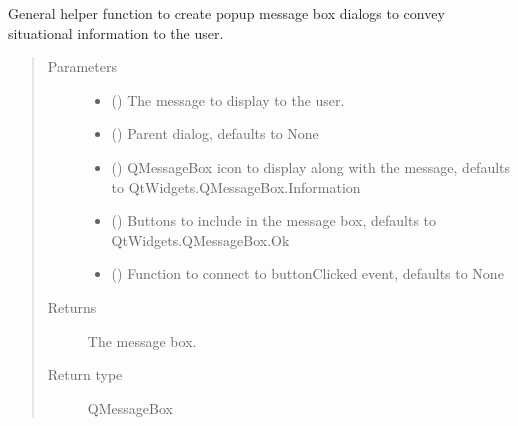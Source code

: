 \documentclass[letterpaper,10pt,english]{sphinxmanual}
\begin{document}
\begin{fulllineitems}
\label{\detokenize{polo.utils:polo.utils.dialog_utils.make_message_box}}
General helper function to create popup message box dialogs to convey
situational information to the user.
\begin{quote}\begin{description}
\item[{Parameters}] \leavevmode\begin{itemize}
\item {} 
 () \textendash{} The message to display to the user.

\item {} 
 (\sphinxstyleliteralemphasis{\sphinxupquote{, }}) \textendash{} Parent dialog, defaults to None

\item {} 
 (\sphinxstyleliteralemphasis{\sphinxupquote{, }}) \textendash{} QMessageBox icon to display along with the message,
defaults to QtWidgets.QMessageBox.Information

\item {} 
 (\sphinxstyleliteralemphasis{\sphinxupquote{, }}) \textendash{} Buttons to include in the message box,
defaults to QtWidgets.QMessageBox.Ok

\item {} 
 (\sphinxstyleliteralemphasis{\sphinxupquote{, }}) \textendash{} Function to connect to
buttonClicked event, defaults to None

\end{itemize}

\item[{Returns}] \leavevmode
The message box.

\item[{Return type}] \leavevmode
QMessageBox

\end{description}\end{quote}

\end{fulllineitems}
\end{document}
